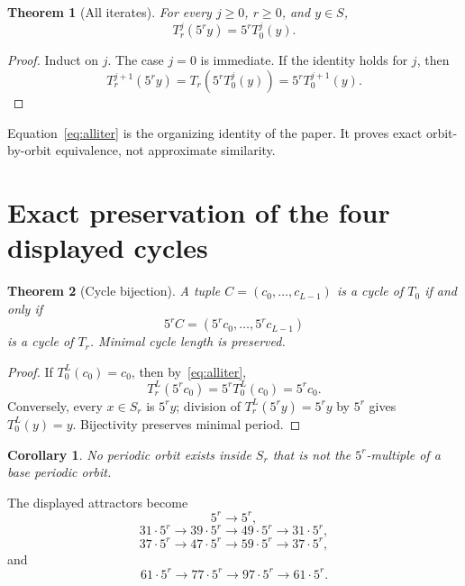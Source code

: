 \documentclass[11pt]{article}
\newtheorem{theorem}{Theorem}
\newtheorem{corollary}{Corollary}
\begin{document}
\begin{theorem}[All iterates]
For every $j\ge0$, $r\ge0$, and $y\in S$,
\begin{equation}
T_r^j(5^r y)=5^rT_0^j(y).
\label{eq:alliter}
\end{equation}
\end{theorem}
\begin{proof}
Induct on $j$. The case $j=0$ is immediate. If the identity holds for $j$, then
\[
T_r^{j+1}(5^r y)=T_r(5^rT_0^j(y))=5^rT_0^{j+1}(y).
\]
\end{proof}

Equation~\eqref{eq:alliter} is the organizing identity of the paper. It proves exact orbit-by-orbit equivalence, not approximate similarity.

\section{Exact preservation of the four displayed cycles}
\begin{theorem}[Cycle bijection]
A tuple $C=(c_0,\ldots,c_{L-1})$ is a cycle of $T_0$ if and only if
\[
5^rC=(5^rc_0,\ldots,5^rc_{L-1})
\]
is a cycle of $T_r$. Minimal cycle length is preserved.
\end{theorem}
\begin{proof}
If $T_0^L(c_0)=c_0$, then by~\eqref{eq:alliter},
\[
T_r^L(5^rc_0)=5^rT_0^L(c_0)=5^rc_0.
\]
Conversely, every $x\in S_r$ is $5^ry$; division of $T_r^L(5^ry)=5^ry$ by $5^r$ gives $T_0^L(y)=y$. Bijectivity preserves minimal period.
\end{proof}

\begin{corollary}
No periodic orbit exists inside $S_r$ that is not the $5^r$-multiple of a base periodic orbit.
\end{corollary}

The displayed attractors become
\begin{equation}
5^r\to5^r,
\label{eq:fixscaled}
\end{equation}
\begin{equation}
31\cdot5^r\to39\cdot5^r\to49\cdot5^r\to31\cdot5^r,
\label{eq:c31scaled}
\end{equation}
\begin{equation}
37\cdot5^r\to47\cdot5^r\to59\cdot5^r\to37\cdot5^r,
\label{eq:c37scaled}
\end{equation}
and
\begin{equation}
61\cdot5^r\to77\cdot5^r\to97\cdot5^r\to61\cdot5^r.
\label{eq:c61scaled}
\end{equation}
\end{document}
